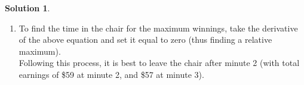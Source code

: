 \documentclass{article}
\theoremstyle{definition}
\newtheorem*{solution}{Solution}
\begin{document}
\begin{solution}
\begin{enumerate}[label = \alph*)]
    \item
    To find the time in the chair for the maximum winnings, take the derivative of the above equation and set it equal to zero (thus finding a relative maximum). \\
    Following this process, it is best to leave the chair after minute 2 (with total earnings of \$59 at minute 2, and \$57 at minute 3).
    
\end{enumerate}
\end{solution}
\end{document}
